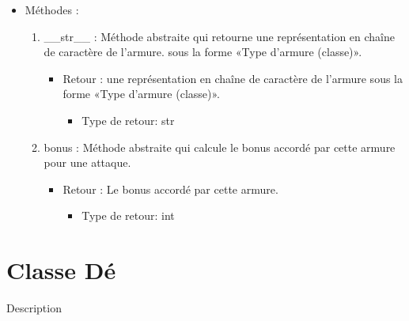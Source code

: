 \documentclass[12pt,pdftex,oneside]{article}
\begin{document}
\begin{itemize}
\begin{enumerate}
  \end{enumerate}

  \item Méthodes : 

    \begin{enumerate}
    \item \_\_str\_\_ : Méthode abstraite qui retourne une représentation en chaîne de caractère de l'armure.
      sous la forme «Type d'armure (classe)».
      \begin{itemize}
      \item Retour :  une représentation en chaîne de caractère de l'armure
      sous la forme «Type d'armure (classe)».
          \begin{itemize}
          \item Type de retour: str
          \end{itemize}
      \end{itemize}
    \item bonus : Méthode abstraite qui calcule le bonus accordé par cette armure
      pour une attaque.
      \begin{itemize}
      \item Retour : Le bonus accordé par cette armure.
          \begin{itemize}
          \item Type de retour: int
          \end{itemize}
      \end{itemize}
    \end{enumerate}

  \end{itemize}

  \section {Classe Dé}

  Description
\end{document}
